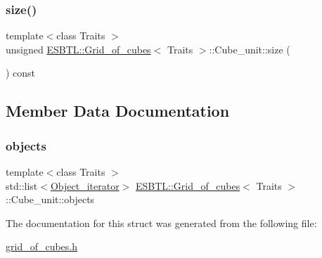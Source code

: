 \subsubsection{\texorpdfstring{size()}{size()}}
{\footnotesize\ttfamily template$<$class Traits $>$ \\
unsigned \hyperlink{structESBTL_1_1Grid__of__cubes}{E\+S\+B\+T\+L\+::\+Grid\+\_\+of\+\_\+cubes}$<$ Traits $>$\+::Cube\+\_\+unit\+::size (\begin{DoxyParamCaption}{ }\end{DoxyParamCaption}) const\hspace{0.3cm}{\ttfamily [inline]}}



\subsection{Member Data Documentation}
\mbox{\label{structESBTL_1_1Grid__of__cubes_1_1Cube__unit_a06a4ded54f248adda693b662082b6a20}} 
\subsubsection{\texorpdfstring{objects}{objects}}
{\footnotesize\ttfamily template$<$class Traits $>$ \\
std\+::list$<$\hyperlink{structESBTL_1_1Grid__of__cubes_ae77665f05d6c7ae05c3d2d764df99193}{Object\+\_\+iterator}$>$ \hyperlink{structESBTL_1_1Grid__of__cubes}{E\+S\+B\+T\+L\+::\+Grid\+\_\+of\+\_\+cubes}$<$ Traits $>$\+::Cube\+\_\+unit\+::objects}



The documentation for this struct was generated from the following file\+:\begin{DoxyCompactItemize}
\item 
\hyperlink{grid__of__cubes_8h}{grid\+\_\+of\+\_\+cubes.\+h}\end{DoxyCompactItemize}

